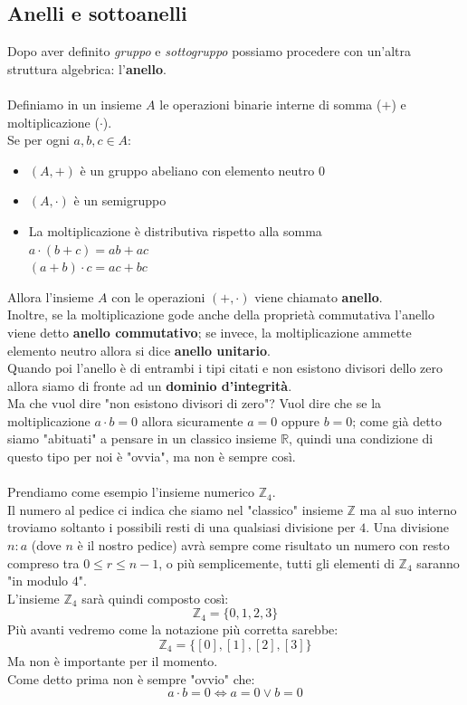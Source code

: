 \subsection{Anelli e sottoanelli}
Dopo aver definito \emph{gruppo} e \emph{sottogruppo} possiamo 
procedere con un'altra struttura algebrica: l'\textbf{anello}.
\\
\\
Definiamo in un insieme \(A\) le operazioni binarie interne di somma 
(\(+\)) e moltiplicazione (\(\cdot\)). \\
Se per ogni \(a,b,c \in A\):

\begin{itemize}
  
  \item \( (A, +) \) è un gruppo abeliano con elemento neutro \(0\)
  \item \( (A, \cdot) \) è un semigruppo
  \item La moltiplicazione è distributiva rispetto alla somma \\
  \( a \cdot (b + c) = ab + ac\) \\
  \( (a + b) \cdot c = ac + bc\)

\end{itemize}

Allora l'insieme \(A\) con le operazioni \( (+, \cdot) \) viene chiamato \textbf{anello}.\\
Inoltre, se la moltiplicazione gode anche della proprietà commutativa l'anello viene detto 
\textbf{anello commutativo}; se invece, la moltiplicazione ammette elemento neutro allora si dice
\textbf{anello unitario}. \\
Quando poi l'anello è di entrambi i tipi citati e non esistono divisori 
dello zero allora siamo di fronte
ad un \textbf{dominio d'integrità}. \\ 
Ma che vuol dire "non esistono divisori di zero"?
Vuol dire che se la moltiplicazione \(a \cdot b = 0\) allora sicuramente \(a = 0\) oppure \(b = 0\);
come già detto siamo "abituati" a pensare in un classico insieme \(\mathbb{R}\), quindi
una condizione di questo tipo per noi è "ovvia", ma non è sempre così.
\\
\\
Prendiamo come esempio l'insieme numerico \(\mathbb{Z}_4\). \\
Il numero al pedice ci indica che siamo nel "classico" insieme \(\mathbb{Z}\) 
ma al suo interno troviamo soltanto i possibili resti di una qualsiasi divisione per \(4\).
Una divisione \(n : a\) (dove \(n\) è il nostro pedice) avrà sempre come risultato un numero con resto compreso tra 
\(0 \le r \le n - 1\), o più semplicemente, tutti gli elementi di \(\mathbb{Z}_4\)
saranno "in modulo \(4\)". \\
L'insieme \(\mathbb{Z}_4\) sarà quindi composto così:
\[ \mathbb{Z}_4 = \{ 0, 1, 2, 3\} \]
Più avanti vedremo come la notazione più corretta sarebbe:
\[ \mathbb{Z}_4 = \{ [0], [1], [2], [3]\} \]
Ma non è importante per il momento. \\
Come detto prima non è sempre "ovvio" che: 
\[ a \cdot b = 0 \iff a = 0 \lor b = 0\]

